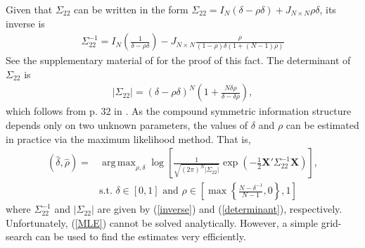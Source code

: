 \documentclass[11pt,twoside]{article}
\DeclareMathOperator*{\argmax}{arg\,max}
\begin{document}
Given that $\Sigma_{22}$ can be written in the form  $\Sigma_{22} = I_N (\delta-\rho\delta) + J_{N \times N} \rho\delta$, its inverse is
\begin{align}
\Sigma_{22}^{-1} = I_N \left(\frac{1}{\delta-\rho\delta} \right) - J_{N \times N} \frac{\rho}{(1-\rho)\delta(1+(N-1) \rho)} \label{inverse}
\end{align}
See the supplementary material of \cite{dobbin2005sample} for the proof of this fact.  The determinant of $\Sigma_{22}$ is
\begin{align}
| \Sigma_{22}| = (\delta - \rho\delta)^N \left(1+\frac{N \delta \rho}{\delta - \delta\rho} \right),\label{determinant}
\end{align}
which follows from p. 32 in \cite{rao2009linear}. As the compound symmetric information structure depends only on two unknown parameters, the values of $\delta$ and $\rho$ can be estimated in practice via the maximum likelihood method. That is,
\begin{align}
(\hat{\delta}, \hat{\rho}) =& \argmax_{\rho, \delta} \log \left[ \frac{1}{\sqrt{(2\pi)^N |\Sigma_{22}|}} \exp\left( -\frac{1}{2} \boldsymbol{X}' \Sigma_{22}^{-1} \boldsymbol{X} \right) \right], \label{MLE}\\
& \text{s.t. } \nonumber \delta \in [0,1] \text{ and } \rho \in \left[  \max \left\{ \frac{N-\delta^{-1}}{N-1}, 0\right\}, 1 \right]
\end{align}
where $\Sigma_{22}^{-1}$ and $|\Sigma_{22}|$ are given by (\ref{inverse}) and (\ref{determinant}), respectively. Unfortunately, (\ref{MLE}) cannot be solved analytically. However, a simple grid-search can be used to find the estimates very efficiently. 





\end{document}
